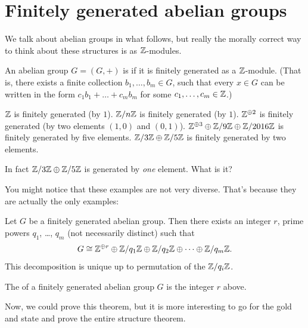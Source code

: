 \section{Finitely generated abelian groups}
\label{sec:FTFGAG}
\begin{remark}
	We talk about abelian groups in what follows, but really the
	morally correct way to think about these structures is as $\mathbb Z$-modules.
\end{remark}
\begin{definition}
	An abelian group $G = (G,+)$ is 
	if it is finitely generated as a $\mathbb Z$-module.
	(That is, there exists a finite collection $b_1, \dots, b_m \in G$,
	such that every $x \in G$ can be written in the form
	$c_1 b_1 + \dots + c_m b_m$ for some $c_1, \dots, c_m \in \mathbb Z$.)
\end{definition}
\begin{example}
	\listhack
	\begin{enumerate}[(a)]
		\ii $\mathbb Z$ is finitely generated (by $1$).
		\ii $\mathbb Z/n\mathbb Z$ is finitely generated (by $1$).
		\ii $\mathbb Z^{\oplus 2}$ is finitely generated (by two elements $(1,0)$ and $(0,1)$).
		\ii $\mathbb Z^{\oplus 3} \oplus \mathbb Z/9\mathbb Z \oplus \mathbb Z/2016\mathbb Z$ is
		finitely generated by five elements.
		\ii $\mathbb Z/3\mathbb Z\oplus\mathbb Z/5\mathbb Z$ is finitely generated by two elements.
	\end{enumerate}
\end{example}
\begin{exercise}
	In fact $\mathbb Z/3\mathbb Z\oplus\mathbb Z/5\mathbb Z$ is generated by \emph{one} element.
	What is it?
\end{exercise}
You might notice that these examples are not very diverse.
That's because they are actually the only examples:
\begin{theorem}
	\label{thm:fund_fg_abelian_group}
	Let $G$ be a finitely generated abelian group.
	Then there exists an integer $r$,
	prime powers $q_1$, \dots, $q_m$ (not necessarily distinct) such that
	\[
		G \cong \mathbb Z^{\oplus r} \oplus \mathbb Z/q_1\mathbb Z \oplus \mathbb Z/q_2\mathbb Z \oplus
		\dots \oplus \mathbb Z/q_m\mathbb Z. \]
	This decomposition is unique up to permutation of the $\mathbb Z/q_i\mathbb Z$.
\end{theorem}
\begin{definition}
	The  of a finitely generated abelian group $G$ is the integer $r$ above.
\end{definition}

Now, we could prove this theorem, but it is more interesting to go for the gold
and state and prove the entire structure theorem.

